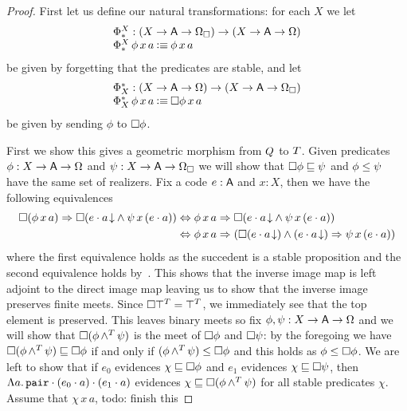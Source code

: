 \documentclass[11pt]{article}
\begin{document}
\begin{proof}
  First let us define our natural transformations: for each \(X\) we let
  \[\begin{array}{l}
      \Phi_\ast^{X} : {{({{X}\to{{{\ensuremath{\mathsf{A}}}\to{\Omega_\Box}}}})}\to{({{X}\to{{{\ensuremath{\mathsf{A}}}\to{\Omega}}}})}}
      \\
      \Phi_\ast^{X}\,\phi\,x\,a \mathbin{\vcentcolon\equiv} \phi\,x\,a
  \end{array}\]
  be given by forgetting that the predicates are stable, and let
  \[\begin{array}{l}
      \Phi^\ast_{X} : {{({{X}\to{{{\ensuremath{\mathsf{A}}}\to{\Omega}}}})}\to{({{X}\to{{{\ensuremath{\mathsf{A}}}\to{\Omega_\Box}}}})}}
      \\
      \Phi^\ast_{X}\,\phi\,x\,a \mathbin{\vcentcolon\equiv} \Box{\phi\,x\,a}
  \end{array}\]
  be given by sending \(\phi\) to \(\Box{\phi}\).

  First we show this gives a geometric morphism from \(Q\) to \(T\).
  Given predicates \(\phi:{{X}\to{{{\ensuremath{\mathsf{A}}}\to{\Omega}}}}\) and \(\psi:{{X}\to{{{\ensuremath{\mathsf{A}}}\to{\Omega_\Box}}}}\) we will
  show that \({\Box{\phi}}\sqsubseteq{\psi}\) and \({\phi}\leq{\psi}\) have the
  same set of realizers.
  Fix a code \(e:\mathsf{A}\) and \(x:X\), then we have the following equivalences
  \begin{align*}
    \IImplies%
    {\IBox{(\phi\,x\,a)}}%
    {\IBox%
    {(\IAnd%
    {\ITotal{\IAp{e}{a}}}%
    {\psi\,x\,(\IAp{e}{a})})}}
    &\IIFFSym
      \IImplies%
      {\phi\,x\,a}%
      {\IBox%
      {(\IAnd%
      {\ITotal{\IAp{e}{a}}}%
      {\psi\,x\,(\IAp{e}{a})})}}
    \\
    &\IIFFSym
      \IImplies%
      {\phi\,x\,a}%
      {(\IAnd%
      {\IBox{(\ITotal{\IAp{e}{a}})}}%
      {\IImplies%
      {(\ITotal{\IAp{e}{a}})}%
      {\psi\,x\,(\IAp{e}{a})}})}
  \end{align*}
  where the first equivalence holds as the succedent is a stable proposition and
  the second equivalence holds by~.
  This shows that the inverse image map is left adjoint to the direct image map
  leaving us to show that the inverse image preserves finite meets.
  Since \(\Box{\top^{T}}=\top^{T}\), we immediately see that the top element is
  preserved.
  This leaves binary meets so fix \(\phi,\psi:{{X}\to{{{\ensuremath{\mathsf{A}}}\to{\Omega}}}}\) and we will show
  that \(\Box{({\phi}\mathop{{\land^{T}}}{\psi})}\) is the meet of \(\Box{\phi}\)
  and \(\Box{\psi}\):
  by the foregoing we have \({\Box{({\phi}\mathop{{\land^{T}}}{\psi})}}\sqsubseteq{\Box{\phi}}\)
  if and only if \({({\phi}\mathop{{\land^{T}}}{\psi})}\leq{\Box{\phi}}\) and this holds as
  \({\phi}\leq{\Box{\phi}}\).
  We are left to show that if \(e_{0}\) evidences \({\chi}\sqsubseteq{\Box{\phi}}\)
  and \(e_{1}\) evidences \({\chi}\sqsubseteq{\Box{\psi}}\), then
  \(\Lambda{a}.\,{{{\texttt{pair}}\cdot{({e_{0}}\cdot{a})}}\cdot{({e_{1}}\cdot{a})}}\)
  evidences \({\chi}\sqsubseteq{\Box{({\phi}\mathop{{\land^{T}}}{\psi})}}\) for all stable
  predicates \(\chi\).
  Assume that \(\chi\,x\,a\), {\color{red} todo: finish this}


\end{proof}
\end{document}
